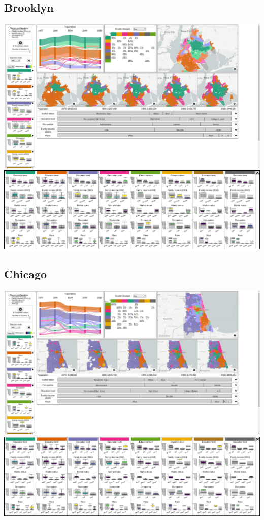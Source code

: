 \documentclass[a4paper]{article}
\begin{document}
\subsection{Brooklyn}
\begin{center}
	\includegraphics[width=\linewidth]{15a.png}
	\includegraphics[width=\linewidth]{15b.png}
\end{center} \clearpage



\subsection{Chicago}
\begin{center}
	\includegraphics[width=\linewidth]{16a.png}
	\includegraphics[width=\linewidth]{16b.png}
\end{center} \clearpage
\end{document}
